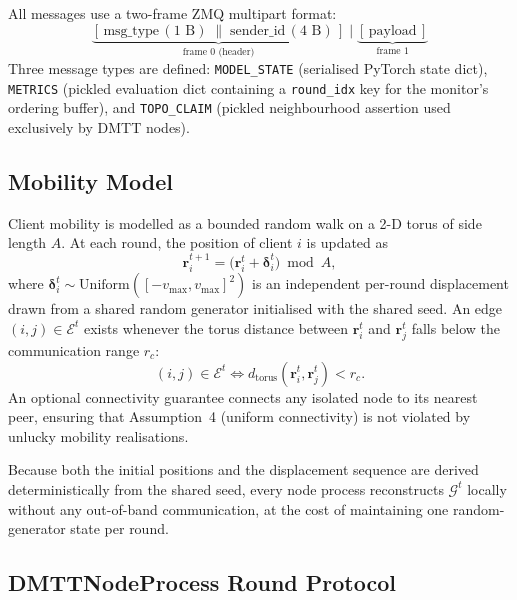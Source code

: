 \documentclass[journal]{IEEEtran}
\newenvironment{added}{\begingroup\color{addedcolor}}{\endgroup}
\theoremstyle{definition}
\theoremstyle{remark}
\begin{document}
\begin{added}
All messages use a two-frame ZMQ multipart format:
\begin{equation*}
  \underbrace{[\,\text{msg\_type}\,(1\text{ B})\;\|\;\text{sender\_id}\,(4\text{ B})\,]}_{\text{frame 0 (header)}}
  \;\Big|\;
  \underbrace{[\,\text{payload}\,]}_{\text{frame 1}}
\end{equation*}
Three message types are defined: \texttt{MODEL\_STATE} (serialised PyTorch state dict), \texttt{METRICS} (pickled evaluation dict containing a \texttt{round\_idx} key for the monitor's ordering buffer), and \texttt{TOPO\_CLAIM} (pickled neighbourhood assertion used exclusively by DMTT nodes).
\end{added}

\subsection{Mobility Model}
\label{sec:mobility_impl}

\begin{added}
Client mobility is modelled as a bounded random walk on a 2-D torus of side length $A$.
At each round, the position of client $i$ is updated as
\begin{equation}
  \mathbf{r}_i^{t+1} = \bigl(\mathbf{r}_i^t + \boldsymbol{\delta}_i^t\bigr) \bmod A,
  \label{eq:random_walk}
\end{equation}
where $\boldsymbol{\delta}_i^t \sim \mathrm{Uniform}([-v_{\max}, v_{\max}]^2)$ is an independent per-round displacement drawn from a shared random generator initialised with the shared seed.
An edge $(i,j) \in \mathcal{E}^t$ exists whenever the torus distance between $\mathbf{r}_i^t$ and $\mathbf{r}_j^t$ falls below the communication range $r_c$:
\begin{equation}
  (i,j)\in\mathcal{E}^t \iff d_{\mathrm{torus}}(\mathbf{r}_i^t,\mathbf{r}_j^t) < r_c.
  \label{eq:edge_condition}
\end{equation}
An optional connectivity guarantee connects any isolated node to its nearest peer, ensuring that Assumption~4 (uniform connectivity) is not violated by unlucky mobility realisations.

Because both the initial positions and the displacement sequence are derived deterministically from the shared seed, every node process reconstructs $\mathcal{G}^t$ locally without any out-of-band communication, at the cost of maintaining one random-generator state per round.
\end{added}

\subsection{DMTTNodeProcess Round Protocol}
\end{document}

